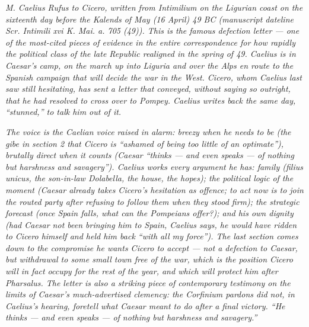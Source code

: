 
\textit{M. Caelius Rufus to Cicero, written from
Intimilium on the Ligurian coast on the sixteenth day
before the Kalends of May (16 April) 49 BC (manuscript
dateline \textit{Scr. Intimili xvi K. Mai. a. 705 (49)}).
This is the famous defection letter --- one of the
most-cited pieces of evidence in the entire correspondence
for how rapidly the political class of the late Republic
realigned in the spring of 49. Caelius is in Caesar's
camp, on the march up into Liguria and over the Alps en
route to the Spanish campaign that will decide the war
in the West. Cicero, whom Caelius last saw still
hesitating, has sent a letter that conveyed, without
saying so outright, that he had resolved to cross over
to Pompey. Caelius writes back the same day, ``stunned,''
to talk him out of it.}

\textit{The voice is the Caelian voice raised in alarm:
breezy when he needs to be (the gibe in section 2 that
Cicero is ``ashamed of being too little of an optimate''),
brutally direct when it counts (Caesar ``thinks --- and
even speaks --- of nothing but harshness and savagery'').
Caelius works every argument he has: family
(\textit{filius unicus}, the son-in-law Dolabella, the
house, the hopes); the political logic of the moment
(Caesar already takes Cicero's hesitation as offence;
to act now is to join the routed party after refusing to
follow them when they stood firm); the strategic forecast
(once Spain falls, what can the Pompeians offer?); and
his own dignity (had Caesar not been bringing him to
Spain, Caelius says, he would have ridden to Cicero
himself and held him back ``with all my force''). The
last section comes down to the compromise he wants Cicero
to accept --- not a defection to Caesar, but withdrawal
to some small town free of the war, which is the
position Cicero will in fact occupy for the rest of the
year, and which will protect him after Pharsalus. The
letter is also a striking piece of contemporary testimony
on the limits of Caesar's much-advertised clemency: the
Corfinium pardons did not, in Caelius's hearing, foretell
what Caesar meant to do after a final victory. ``He
thinks --- and even speaks --- of nothing but harshness
and savagery.''}

